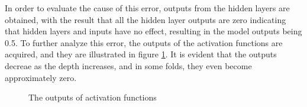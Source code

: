 \documentclass[12pt,twoside]{report}
\begin{document}
In order to evaluate the cause of this error, outputs from the hidden layers are obtained, with the result that all the hidden layer outputs are zero indicating that hidden layers and inputs have no effect, resulting in the model outputs being 0.5. To further analyze this error, the outputs of the activation functions are acquired, and they are illustrated in figure \ref{vanish_gradient}. It is evident that the outputs decreae as the depth increases, and in some folds, they even become approximately zero.
\\

\begin{figure}[!htbp]
	\centering
	\hfill
	\hfill
	\hfil
	\hfil
	\caption{The outputs of activation functions}
	\label{vanish_gradient}
\end{figure}
\end{document}
